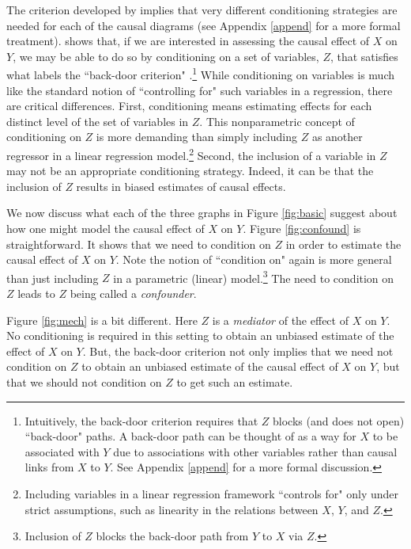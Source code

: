 \documentclass[12pt,reqno,titlepage]{amsart}
\begin{document}
\begin{doublespace}
The criterion developed by \citet{Pearl:2009vo} implies that very different conditioning strategies are needed for each of the causal diagrams (see Appendix \ref{append} for a more formal treatment). 
\citet{Pearl:2009vo} shows that, if we are interested in assessing the causal effect of $X$ on $Y$, we may be able to do so by conditioning on a set of variables, $Z$, that satisfies what \citet{Pearl:2009vo} labels the ``back-door criterion" \citep[p.79]{Pearl:2009vo}.\footnote{
Intuitively, the back-door criterion requires that $Z$ blocks (and does not open) ``back-door" paths.
A back-door path can be thought of as a way for $X$ to be associated with $Y$ due to associations with other variables rather than causal links from $X$ to $Y$.
See Appendix \ref{append} for a more formal discussion.}
While conditioning on variables is much like the standard notion of ``controlling for" such variables in a regression, there are critical differences.
First, conditioning means estimating effects for each distinct level of the set of variables in $Z$. 
This nonparametric concept of conditioning on $Z$ is more demanding than simply including $Z$ as another regressor in a linear regression model.\footnote{Including variables in a linear regression framework ``controls for" only under strict assumptions, such as linearity in the relations between $X$, $Y$, and $Z$.}
Second, the inclusion of a variable in $Z$ may not be an appropriate conditioning strategy. Indeed, it can be that the inclusion of $Z$ results in biased estimates of causal effects.

We now discuss what each of the three graphs in Figure \ref{fig:basic} suggest about how one might model the causal effect of $X$ on $Y$.	
Figure \ref{fig:confound} is straightforward. It shows that we need to condition on $Z$ in order to estimate the causal effect of $X$ on $Y$.
Note the notion of ``condition on" again is more general than just including $Z$ in a parametric (linear) model.\footnote{
Inclusion of $Z$ blocks the back-door path from $Y$ to $X$ via $Z$.} The need to condition on $Z$ leads to $Z$ being called a \emph{confounder}.


Figure \ref{fig:mech} is a bit different. Here $Z$ is a \emph{mediator} of the effect of $X$ on $Y$.
No conditioning is required in this setting to obtain an unbiased estimate of the effect of $X$ on $Y$.
But, the back-door criterion not only implies that we need not condition on $Z$ to obtain an unbiased estimate of the causal effect of $X$ on $Y$, but that we should not condition on $Z$ to get such an estimate.


\end{doublespace}
\end{document}

